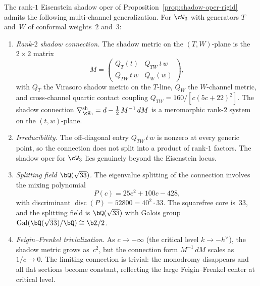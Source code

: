 \begin{proposition}
\label{prop:shadow-langlands-hierarchy}
The rank-$1$ Eisenstein shadow oper of
Proposition~\textup{\ref{prop:shadow-oper-rigid}} admits the
following multi-channel generalization.
For $\cW_3$ with generators $T$ and~$W$ of conformal
weights~$2$ and~$3$:
\begin{enumerate}[label=\textup{(\roman*)}]
\item \emph{Rank-$2$ shadow connection.}\enspace
 The shadow metric on the $(T,W)$-plane is the $2 \times 2$
 matrix
 \begin{equation}\label{eq:w3-shadow-connection-matrix}
 M =
 \begin{pmatrix}
 Q_T(t) & Q_{TW}\,t\,w \\
 Q_{TW}\,t\,w & Q_W(w)
 \end{pmatrix},
 \end{equation}
 with $Q_T$ the Virasoro shadow metric on the $T$-line,
 $Q_W$ the $W$-channel metric, and cross-channel quartic
 contact coupling $Q_{TW} = 160/[c(5c{+}22)^2]$.
 The shadow connection
 $\nabla^{\mathrm{sh}}_{\cW_3}
 = d - \tfrac{1}{2}\,M^{-1}\,dM$
 is a meromorphic rank-$2$ system on the $(t,w)$-plane.

\item \emph{Irreducibility.}\enspace
 The off-diagonal entry $Q_{TW}\,t\,w$ is nonzero at every
 generic point, so the connection does not split into a product
 of rank-$1$ factors. The shadow oper for $\cW_3$ lies
 genuinely beyond the Eisenstein locus.

\item \emph{Splitting field $\bQ(\sqrt{33})$.}\enspace
 The eigenvalue splitting of the connection involves the
 mixing polynomial
 \begin{equation}\label{eq:mixing-polynomial-w3}
 P(c) = 25c^2 + 100c - 428,
 \end{equation}
 with discriminant
 $\operatorname{disc}(P) = 52800 = 40^2 \cdot 33$.
 The squarefree core is~$33$, and the splitting field is
 $\bQ(\sqrt{33})$ with Galois group
 $\operatorname{Gal}(\bQ(\sqrt{33})/\bQ) \cong \bZ/2$.

\item \emph{Feigin--Frenkel trivialization.}\enspace
 As $c \to -\infty$
 \textup{(}the critical level $k \to -h^\vee$\textup{)},
 the shadow metric grows as~$c^2$, but the connection
 form $M^{-1}\,dM$ scales as $1/c \to 0$. The limiting
 connection is trivial: the monodromy disappears and all flat
 sections become constant, reflecting the large Feigin--Frenkel
 center at critical level.
\end{enumerate}


\end{proposition}
